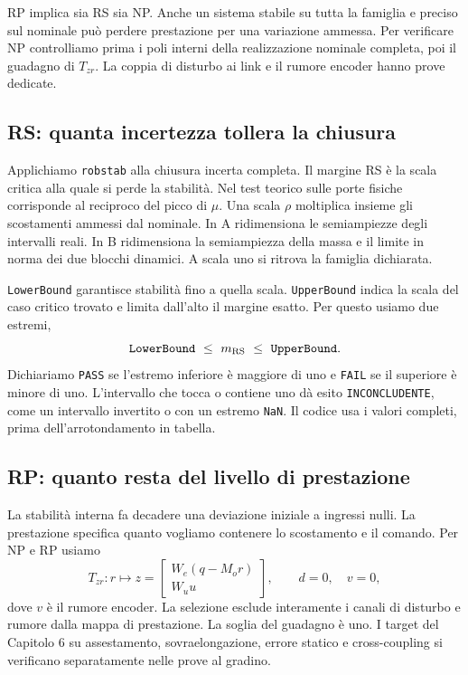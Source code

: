 RP implica sia RS sia NP. Anche un sistema stabile su tutta la famiglia
e preciso sul nominale può perdere prestazione per una variazione
ammessa. Per verificare NP controlliamo prima i poli interni della
realizzazione nominale completa, poi il guadagno di $T_{zr}$.
La coppia di disturbo ai link e il rumore encoder hanno prove dedicate.

\subsection{RS: quanta incertezza tollera la chiusura}

Applichiamo \texttt{robstab} alla chiusura incerta completa.
Il margine RS è la scala critica alla quale si perde la stabilità.
Nel test teorico sulle porte fisiche corrisponde al reciproco
del picco di $\mu$. Una scala $\rho$ moltiplica insieme gli scostamenti
ammessi dal nominale. In A ridimensiona le semiampiezze degli
intervalli reali. In B ridimensiona la semiampiezza della massa e il
limite in norma dei due blocchi dinamici. A scala uno si ritrova
la famiglia dichiarata.

\texttt{LowerBound} garantisce stabilità fino a quella scala.
\texttt{UpperBound} indica la scala del caso critico trovato e
limita dall'alto il margine esatto. Per questo usiamo due estremi,
\[
 \texttt{LowerBound}\ \leq\ m_{\rm RS}\ \leq\ \texttt{UpperBound}.
\]
Dichiariamo \texttt{PASS} se l'estremo inferiore è maggiore di uno
e \texttt{FAIL} se il superiore è minore di uno. L'intervallo che
tocca o contiene uno dà esito \texttt{INCONCLUDENTE}, come un
intervallo invertito o con un estremo \texttt{NaN}. Il codice usa i
valori completi, prima dell'arrotondamento in tabella.

\subsection{RP: quanto resta del livello di prestazione}

La stabilità interna fa decadere una deviazione iniziale a
ingressi nulli. La prestazione specifica quanto vogliamo contenere
lo scostamento e il comando. Per NP e RP usiamo
\[
 T_{zr}: r\longmapsto z=\begin{bmatrix}W_e(q-M_or)\\W_uu\end{bmatrix},
 \qquad d=0,\quad v=0,
\]
dove $v$ è il rumore encoder. La selezione esclude interamente
i canali di disturbo e rumore dalla mappa di prestazione. La soglia
del guadagno è uno. I target del
Capitolo 6 su assestamento, sovraelongazione, errore statico e
cross-coupling si verificano separatamente nelle prove al gradino.

